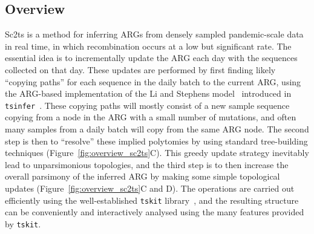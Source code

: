 \documentclass{article}
\begin{document}
\subsection{Overview}
Sc2ts is a method for inferring ARGs from densely sampled pandemic-scale data
in real time, in which recombination occurs at a low but significant rate.
The essential idea is to incrementally update the ARG each day
with the sequences collected on that day. These updates are performed by
first finding likely ``copying paths'' for each sequence in the daily
batch to the current ARG, using the ARG-based implementation of
the Li and Stephens model~\citep{Li2003-ib} introduced
in \texttt{tsinfer}~\citep{Kelleher2019-ba}.
These copying paths
will mostly consist of a new sample sequence copying from a node in the ARG
with a small number of mutations, and often many samples
from a daily batch will copy from the same ARG node. The second
step is then to ``resolve'' these implied polytomies by using
standard tree-building techniques (Figure~\ref{fig:overview_sc2ts}C).
This greedy update strategy inevitably lead to unparsimonious
topologies, and the third step is to then increase the
overall parsimony of the inferred ARG by making some simple topological
updates (Figure~\ref{fig:overview_sc2ts}C and D).
The operations are carried out efficiently using the well-established
\texttt{tskit} library~\citep{Kelleher2018-xc,Ralph2020-efficiently},
and the resulting structure can be conveniently and interactively
analysed using the many features provided by \texttt{tskit}.
\end{document}
